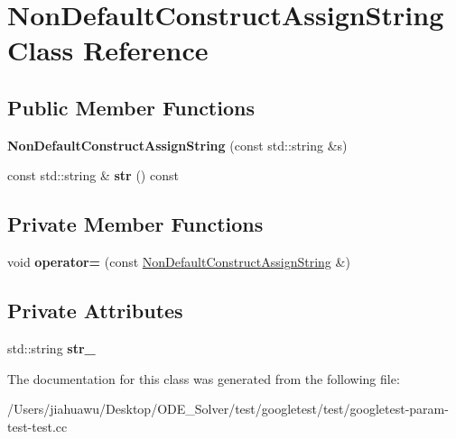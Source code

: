 \hypertarget{class_non_default_construct_assign_string}{}\section{Non\+Default\+Construct\+Assign\+String Class Reference}
\label{class_non_default_construct_assign_string}
\subsection*{Public Member Functions}
\begin{DoxyCompactItemize}
\item 
\mbox{\label{class_non_default_construct_assign_string_a85e34ec502250fb18edd56a86353d20d}} 
{\bfseries Non\+Default\+Construct\+Assign\+String} (const std\+::string \&s)
\item 
\mbox{\label{class_non_default_construct_assign_string_a7b428e839204101cb3b7f5b14a66688c}} 
const std\+::string \& {\bfseries str} () const
\end{DoxyCompactItemize}
\subsection*{Private Member Functions}
\begin{DoxyCompactItemize}
\item 
\mbox{\label{class_non_default_construct_assign_string_affc4454f81eb10342ddb98c0ff0f424d}} 
void {\bfseries operator=} (const \mbox{\hyperlink{class_non_default_construct_assign_string}{Non\+Default\+Construct\+Assign\+String}} \&)
\end{DoxyCompactItemize}
\subsection*{Private Attributes}
\begin{DoxyCompactItemize}
\item 
\mbox{\label{class_non_default_construct_assign_string_a07f7e8d268e2ebb2188ad47471904351}} 
std\+::string {\bfseries str\+\_\+}
\end{DoxyCompactItemize}


The documentation for this class was generated from the following file\+:\begin{DoxyCompactItemize}
\item 
/\+Users/jiahuawu/\+Desktop/\+O\+D\+E\+\_\+\+Solver/test/googletest/test/googletest-\/param-\/test-\/test.\+cc\end{DoxyCompactItemize}
